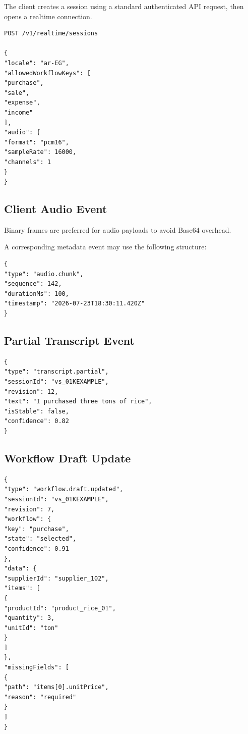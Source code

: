 \documentclass[11pt,a4paper]{article}
\begin{document}
The client creates a session using a standard authenticated API request,
then opens a realtime connection.

\begin{lstlisting}[language={},caption={Create a voice session}]
POST /v1/realtime/sessions

{
"locale": "ar-EG",
"allowedWorkflowKeys": [
"purchase",
"sale",
"expense",
"income"
],
"audio": {
"format": "pcm16",
"sampleRate": 16000,
"channels": 1
}
}
\end{lstlisting}

\subsection{Client Audio Event}

Binary frames are preferred for audio payloads to avoid Base64 overhead.

A corresponding metadata event may use the following structure:

\begin{lstlisting}[language={},caption={Audio chunk metadata event}]
{
"type": "audio.chunk",
"sequence": 142,
"durationMs": 100,
"timestamp": "2026-07-23T18:30:11.420Z"
}
\end{lstlisting}

\subsection{Partial Transcript Event}

\begin{lstlisting}[language={},caption={Partial transcript event}]
{
"type": "transcript.partial",
"sessionId": "vs_01KEXAMPLE",
"revision": 12,
"text": "I purchased three tons of rice",
"isStable": false,
"confidence": 0.82
}
\end{lstlisting}

\subsection{Workflow Draft Update}

\begin{lstlisting}[language={},caption={Incremental workflow draft update}]
{
"type": "workflow.draft.updated",
"sessionId": "vs_01KEXAMPLE",
"revision": 7,
"workflow": {
"key": "purchase",
"state": "selected",
"confidence": 0.91
},
"data": {
"supplierId": "supplier_102",
"items": [
{
"productId": "product_rice_01",
"quantity": 3,
"unitId": "ton"
}
]
},
"missingFields": [
{
"path": "items[0].unitPrice",
"reason": "required"
}
]
}
\end{lstlisting}
\end{document}
